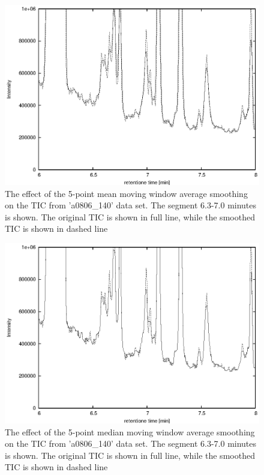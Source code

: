 \begin{figure}[htp]
\begin{center}
\includegraphics{graphics/pyms-test/tic_mean_smoothed.eps}
\caption{The effect of the 5-point mean moving window average smoothing
on the TIC from 'a0806\_140' data set. The segment 6.3-7.0 minutes is
shown. The original TIC is shown in full line, while the smoothed TIC
is shown in dashed line}
\label{fig:smoothed-mean}
\end{center}
\end{figure}

\begin{figure}[htp]
\begin{center}
\includegraphics{graphics/pyms-test/tic_median_smoothed.eps}
\caption{The effect of the 5-point median moving window average smoothing
on the TIC from 'a0806\_140' data set. The segment 6.3-7.0 minutes is
shown. The original TIC is shown in full line, while the smoothed TIC
is shown in dashed line}
\label{fig:smoothed-median}
\end{center}
\end{figure}

